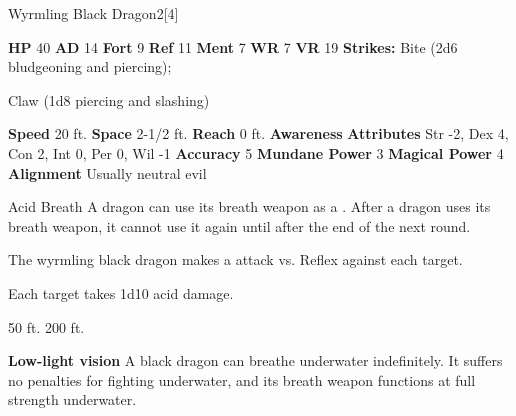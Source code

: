       
  \begin{monsubsection}{Wyrmling Black Dragon}{2}[4]
    \vspace{-1em}\vspace{-1em}
    \vspace{0em}

    
    

    \begin{spellcontent}
      \begin{spelltargetinginfo}
        \pari \textbf{HP} 40 \monsep
          \textbf{AD} 14 \monsep
          \textbf{Fort} 9 \monsep
          \textbf{Ref} 11 \monsep
          \textbf{Ment} 7
        \pari \textbf{WR} 7 \monsep
        \textbf{VR} 19
        \pari \textbf{Strikes:}
            Bite  (2d6 bludgeoning and piercing);
\par Claw  (1d8 piercing and slashing)
      \end{spelltargetinginfo}
    \end{spellcontent}
    \begin{monsterfooter}
      \pari \textbf{Speed} 20 ft. \monsep
        \textbf{Space} 2-1/2 ft. \monsep
        \textbf{Reach} 0 ft.
      \pari \textbf{Awareness} 
      \pari \textbf{Attributes}
        Str -2, Dex 4,
        Con 2, Int 0,
        Per 0, Wil -1
      \pari \textbf{Accuracy} 5 \monsep
        \textbf{Mundane Power} 3 \monsep
      \textbf{Magical Power} 4
      \pari \textbf{Alignment} Usually neutral evil
    \end{monsterfooter}
  \end{monsubsection}
  \begin{freeability}{Acid Breath}
      A dragon can use its breath weapon as a .
      After a dragon uses its breath weapon, it cannot use it again until after the end of the next round.
      \par The wyrmling black dragon makes a  attack
        vs. Reflex against each target.
    
    \hit Each target takes 1d10 acid damage.
    \end{freeability}
  
      
       50 ft.
     200 ft.
    \par\noindent\textbf{Low-light vision}
        A black dragon can breathe underwater indefinitely.
        It suffers no penalties for fighting underwater, and its breath weapon functions at full strength underwater.
  

